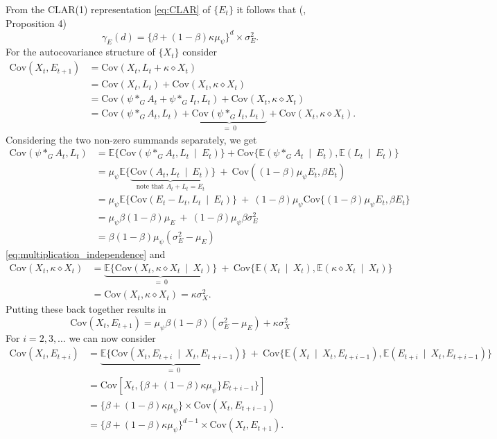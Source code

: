 \documentclass{article}
\begin{document}
From the CLAR(1) representation \eqref{eq:CLAR} of $\{E_t\}$ it follows that (\cite{Grunwald2000}, Proposition 4)
$$
\gamma_E(d) = \{\beta + (1 - \beta)\kappa\mu_\psi\}^d \times \sigma^2_E.
$$
For the autocovariance structure of $\{X_t\}$ consider
\begin{align*}
\text{Cov}(X_t, E_{t + 1}) & = \text{Cov}(X_t, L_t + \kappa \diamond X_t)\\
& = \text{Cov}(X_t, L_t) + \text{Cov}(X_t, \kappa \diamond X_t)\\
& = \text{Cov}(\psi *_G A_t + \psi *_G I_t, L_t) + \text{Cov}(X_t, \kappa \diamond X_t)\\
& = \text{Cov}(\psi *_G A_t, L_t) + \underbrace{\text{Cov}(\psi *_G I_t, L_t)}_{= \ 0} + \text{Cov}(X_t, \kappa \diamond X_t).
\end{align*}
Considering the two non-zero summands separately, we get
\begin{align*}
\text{Cov}(\psi *_G A_t, L_t) & = \mathbb{E}\{\text{Cov}(\psi *_G A_t, L_t \ \mid \ E_t)\} + \text{Cov}\{\mathbb{E}(\psi *_G A_t \ \mid \ E_t), \mathbb{E}(L_t \ \mid \ E_t)\}\\
& = \mu_\psi \mathbb{E}\{\underbrace{\text{Cov}(A_t, L_t \ \mid \ E_t)}_{\text{note that } A_t + L_t = E_t}\} \ + \ \text{Cov}((1 - \beta)\mu_\psi E_t, \beta E_t)\\
& = \mu_\psi \mathbb{E}\{\text{Cov}(E_t - L_t, L_t \ \mid \ E_t)\} \ + \ (1 - \beta)\mu_\psi \text{Cov}\{(1 - \beta)\mu_\psi E_t, \beta E_t\}\\
& = \mu_\psi \beta(1 - \beta)\mu_E \ + \ (1 - \beta)\mu_\psi\beta \sigma^2_E\\
& = \beta(1 - \beta)\mu_\psi(\sigma^2_E - \mu_E)
\end{align*}
\eqref{eq:multiplication_independence}
and
\begin{align*}
\text{Cov}(X_t, \kappa \diamond X_t) & = \underbrace{\mathbb{E}\{\text{Cov}(X_t, \kappa \diamond X_t \ \mid \ X_t)\}}_{= \ 0} \ + \ \text{Cov}\{\mathbb{E}(X_t \ \mid \ X_t), \mathbb{E}(\kappa \diamond X_t \ \mid \ X_t)\}\\
& = \text{Cov}(X_t, \kappa \diamond X_t) = \kappa\sigma^2_X.
\end{align*}
Putting these back together results in
$$
\text{Cov}(X_t, E_{t + 1}) = \mu_\psi\beta(1 - \beta)(\sigma^2_E - \mu_E) + \kappa\sigma^2_X
$$
For $i = 2, 3, \dots$ we can now consider
\begin{align*}
\text{Cov}(X_t, E_{t + i}) & = \underbrace{\mathbb{E}\{\text{Cov}(X_t, E_{t + i} \ \mid \ X_t, E_{t + i - 1})\}}_{= \ 0} \ + \ \text{Cov}\{\mathbb{E}(X_t \ \mid \ X_t, E_{t + i - 1}), \mathbb{E}(E_{t + i} \ \mid \ X_t, E_{t + i - 1})\}\\
& = \text{Cov}[X_t, \{\beta + (1 - \beta)\kappa\mu_\psi\} E_{t + i - 1}\}]\\
& = \{\beta + (1 - \beta)\kappa\mu_\psi\}\times\text{Cov}(X_t, E_{t + i - 1})\\
& = \{\beta + (1 - \beta)\kappa\mu_\psi\}^{d - 1}\times\text{Cov}(X_t, E_{t + 1}).
\end{align*}
\end{document}
